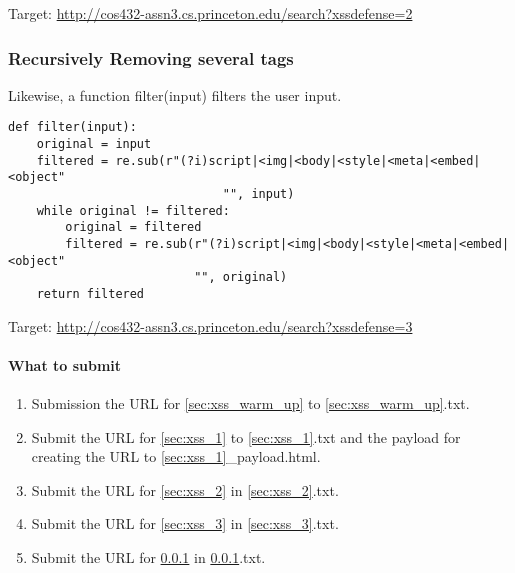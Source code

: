 \documentclass[letterpaper,12pt]{report}
\newcommand{\bungledomain}{http://cos432-assn3.cs.princeton.edu}
\begin{document}
Target: \url{\bungledomain/search?xssdefense=2}\\

\subsubsection{\textbf{Recursively Removing several tags}}
\label{sec:xss_4}
Likewise, a function filter(input) filters the user input.

\begin{mdframed}
\begin{Verbatim}
def filter(input):
    original = input
    filtered = re.sub(r"(?i)script|<img|<body|<style|<meta|<embed|<object"
                              "", input)
    while original != filtered:
        original = filtered
        filtered = re.sub(r"(?i)script|<img|<body|<style|<meta|<embed|<object"
                          "", original)
    return filtered
\end{Verbatim}
\end{mdframed}
\smallskip

Target: \url{\bungledomain/search?xssdefense=3}\\




\paragraph{What to submit}
\begin{enumerate}
\item Submission the URL for \ref{sec:xss_warm_up} to {\ref{sec:xss_warm_up}.txt}. 
\item Submit the URL for {\ref{sec:xss_1}} to {\ref{sec:xss_1}.txt} and the payload for creating the URL to {\ref{sec:xss_1}\_payload.html}.
\item Submit the URL for \ref{sec:xss_2} in {\ref{sec:xss_2}.txt}.
\item Submit the URL for {\ref{sec:xss_3}} in {\ref{sec:xss_3}.txt}.
\item Submit the URL for {\ref{sec:xss_4}} in {\ref{sec:xss_4}.txt}.
\end{enumerate}
\end{document}
